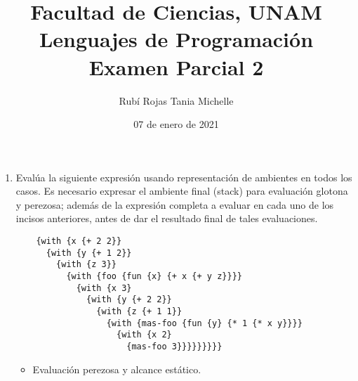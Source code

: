 \documentclass[letterpaper,11pt]{article}
\title{Facultad de Ciencias, UNAM \\ 
       Lenguajes de Programación\\ 
       Examen Parcial 2}
\author{Rubí Rojas Tania Michelle}
\date{07 de enero de 2021}
\begin{document}
\maketitle

\begin{enumerate}
    \item Evalúa la siguiente expresión usando representación de ambientes en 
    todos los casos. Es necesario expresar el ambiente final (stack) para 
    evaluación glotona y perezosa; además de la expresión completa a evaluar 
    en cada uno de los incisos anteriores, antes de dar el resultado final de 
    tales evaluaciones.
    \begin{verbatim}
    {with {x {+ 2 2}}
      {with {y {+ 1 2}}
        {with {z 3}}
          {with {foo {fun {x} {+ x {+ y z}}}}
            {with {x 3}
              {with {y {+ 2 2}}
                {with {z {+ 1 1}}
                  {with {mas-foo {fun {y} {* 1 {* x y}}}}
                    {with {x 2}
                      {mas-foo 3}}}}}}}}}
    \end{verbatim}

    \begin{itemize}
        \item Evaluación perezosa y alcance estático.


\end{itemize}
\end{enumerate}
\end{document}
